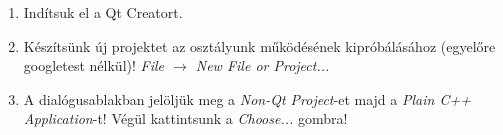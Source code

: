 
\begin{frame}
  \begin{enumerate}
    \item Indítsuk el a Qt Creatort.\\
    \item Készítsünk új projektet az osztályunk működésének kipróbálásához (egyelőre googletest nélkül)! \emph{File $\to$ New File or Project...}
    \item A dialógusablakban jelöljük meg a \emph{Non-Qt Project}-et majd a \emph{Plain C++ Application}-t! Végül kattintsunk a \emph{Choose...} gombra!\\
    \setcounter{qt}{\theenumi}
  \end{enumerate}
\end{frame}

